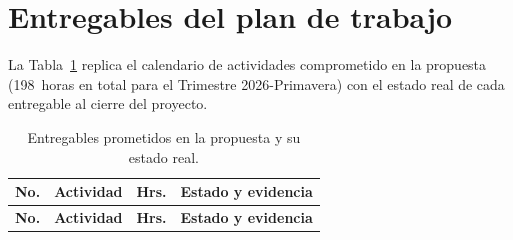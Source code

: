 \section{Entregables del plan de trabajo}\label{apx:entregables}
\justifying

La Tabla~\ref{tab:entregablesReales} replica el calendario de actividades comprometido en la propuesta (198~horas en total para el Trimestre 2026-Primavera) con el estado real de cada entregable al cierre del proyecto.

\begin{longtable}{p{} p{} p{} p{}}
    \caption{Entregables prometidos en la propuesta y su estado real.}
    \label{tab:entregablesReales}\\
    \toprule
    \textbf{No.} & \textbf{Actividad} & \textbf{Hrs.} & \textbf{Estado y evidencia} \\
    \midrule
    \endfirsthead

    \toprule
    \textbf{No.} & \textbf{Actividad} & \textbf{Hrs.} & \textbf{Estado y evidencia} \\
    \midrule
    \endhead


\end{longtable}
